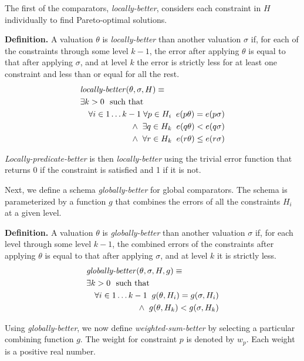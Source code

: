 The first of the comparators, \emph{locally-better}, considers each
constraint in $H$ individually to find Pareto-optimal solutions.

{\bf Definition.}  A valuation $\theta$ is \emph{locally-better} than
another valuation $\sigma$ if, for each of the constraints through some
level $k-1$, the error after applying $\theta$ is equal to that after
applying $\sigma$, and at level $k$ the error is strictly less for at least
one constraint and less than or equal for all the rest.
\begin{eqnarray*}
\lefteqn{\mbox{\em locally-better\/} (\theta,\sigma,H) \equiv } \\
  &  \lefteqn{\exists k>0 \mbox{\rm \ \ such that}} \\
  & & \forall i \in 1 \ldots k-1 \; \forall p \in H_i \;\;
          e(p \theta) = e(p \sigma) \\
  & & \wedge \;\; \exists q \in H_k \;\; e(q \theta) < e(q \sigma)  \\
  & & \wedge \;\; \forall r \in H_k \;\; e(r \theta) \leq e(r \sigma)
\end{eqnarray*}

\emph{Locally-predicate-better} is then \emph{locally-better} using
the trivial error function that returns 0 if the constraint is
satisfied and 1 if it is not.

Next, we define a schema \emph{globally-better} for global comparators.
The schema is parameterized by a function $g$ that combines the errors
of all the constraints $H_i$ at a given level.

{\bf Definition.}  A valuation $\theta$ is \emph{globally-better} than
another valuation $\sigma$ if, for each level through some level $k-1$, the
combined errors of the constraints after applying $\theta$ is
equal to that after applying $\sigma$, and at level $k$ it is strictly less.
\begin{eqnarray*}
\lefteqn{\mbox{\em globally-better\/}(\theta,\sigma,H,g) \equiv } \\
  & \lefteqn{\exists k > 0 \mbox{\rm \ \ such that}} \\
  & & \forall i \in 1 \ldots k-1 \;\;
      g(\theta,H_i) = g(\sigma,H_i) \\
  & & \wedge \;\; g(\theta,H_k) < g(\sigma,H_k)
\end{eqnarray*}

Using \emph{globally-better}, we now define \emph{weighted-sum-better}
by selecting a particular combining function $g$.  The weight for
constraint $p$ is denoted by $w_p$.  Each weight is a positive real
number.

